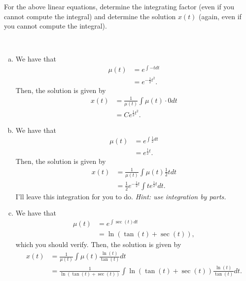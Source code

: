 \documentclass[12pt]{article} %
\begin{document}
\begin{problem}
    For the above linear equations, determine the integrating factor (even if you cannot compute the integral) and determine the solution $x(t)$ (again, even if you cannot compute the integral).
\end{problem}
\begin{solution}~
    \begin{enumerate}[(a)]
        \item We have that
        \begin{align*}
            \mu(t) &= e^{\int -tdt}\\
            &= e^{-\frac{1}{2}t^2}.
        \end{align*}
        Then, the solution is given by
        \begin{align*}
            x(t) &= \frac{1}{\mu(t)} \int \mu(t) \cdot 0 dt\\
            &= Ce^{\frac{1}{2}t^2}.
        \end{align*}
        
        \item We have that
        \begin{align*}
            \mu(t) &= e^{\int \frac{1}{2} dt}\\
            &= e^{\frac{1}{2}t}.
        \end{align*}
        Then, the solution is given by
        \begin{align*}
            x(t) &= \frac{1}{\mu(t)} \int \mu(t) \frac{1}{2} t dt\\
            &= \frac{1}{2} e^{-\frac{1}{2}t} \int te^{\frac{1}{2} t}dt .
        \end{align*} 
        I'll leave this integration for you to do. \emph{Hint: use integration by parts.}

        \item We have that
        \begin{align*}
            \mu(t) &= e^{\int \sec(t) dt}\\
            &= \ln(\tan(t)+\sec(t)),
        \end{align*}
        which you should verify.  Then, the solution is given by
        \begin{align*}
            x(t) &= \frac{1}{\mu(t)} \int \mu(t) \frac{\ln(t)}{\tan(t)} dt\\
            &= \frac{1}{\ln(\tan(t)+\sec(t))} \int \ln(\tan(t)+\sec(t)) \frac{\ln(t)}{\tan(t)}dt.
        \end{align*}
    \end{enumerate}
\end{solution}
\end{document}
